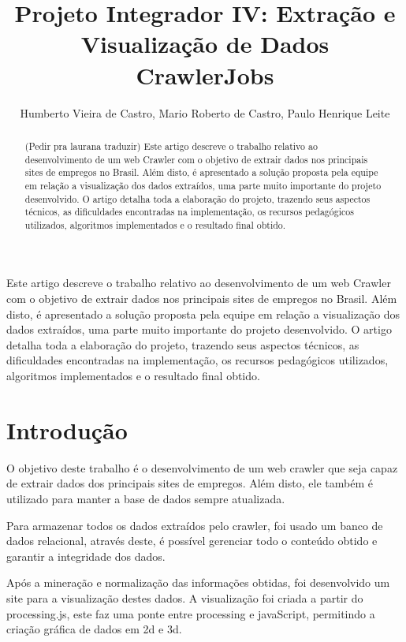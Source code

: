 \documentclass[12pt]{article}
\title{Projeto Integrador IV: Extração e Visualização de Dados\\ CrawlerJobs}
\author{Humberto Vieira de Castro\inst{1}, Mario Roberto de Castro\inst{1}, Paulo Henrique Leite\inst{1}}
\begin{document}
 

\maketitle

\begin{abstract}
(Pedir pra laurana traduzir)
Este artigo descreve o trabalho relativo ao desenvolvimento de um web Crawler com o objetivo de extrair dados nos principais sites de empregos no Brasil. Além disto, é apresentado a solução proposta pela equipe  em relação a visualização dos dados extraídos, uma parte muito importante do projeto desenvolvido. O artigo detalha toda a elaboração do projeto, trazendo seus aspectos técnicos, as dificuldades encontradas na implementação, os recursos pedagógicos utilizados, algoritmos implementados e o resultado final obtido.
\end{abstract}
     
\begin{resumo} 
Este artigo descreve o trabalho relativo ao desenvolvimento de um web Crawler com o objetivo de extrair dados nos principais sites de empregos no Brasil. Além disto, é apresentado a solução proposta pela equipe  em relação a visualização dos dados extraídos, uma parte muito importante do projeto desenvolvido. O artigo detalha toda a elaboração do projeto, trazendo seus aspectos técnicos, as dificuldades encontradas na implementação, os recursos pedagógicos utilizados, algoritmos implementados e o resultado final obtido.
\end{resumo}

\section{Introdução}

O objetivo deste trabalho é o desenvolvimento de um web crawler que seja capaz de extrair dados dos principais sites de empregos. Além disto, ele também é utilizado para manter a base de dados sempre atualizada.

Para armazenar todos os dados extraídos pelo crawler, foi usado um banco de dados relacional, através deste, é possível gerenciar todo o conteúdo obtido e garantir a integridade dos dados.

Após a mineração e normalização das informações obtidas, foi desenvolvido um site para a visualização destes dados. A visualização foi criada a partir do processing.js, este faz uma ponte entre processing e javaScript, permitindo a criação gráfica de dados em 2d e 3d.
\end{document}
